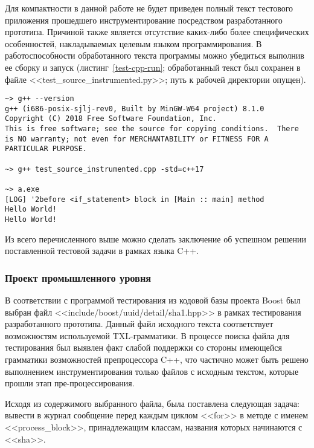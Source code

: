 Для компактности в данной работе не будет приведен полный текст тестового приложения прошедшего инструментирование посредством разработанного прототипа.
Причиной также является отсутствие каких-либо более специфических особенностей, накладываемых целевым языком программирования.
В работоспособности обработанного текста программы можно убедиться выполнив ее сборку и запуск (листинг~\ref{test-cpp-run}; обработанный текст был сохранен в файле <<test\_source\_instrumented.py>>; путь к рабочей директории опущен).

\begin{lstlisting}[frame=single, label={test-cpp-run}, caption={Результаты сборки и запуска обработанного тестового приложения.}]
~> g++ --version
g++ (i686-posix-sjlj-rev0, Built by MinGW-W64 project) 8.1.0
Copyright (C) 2018 Free Software Foundation, Inc.
This is free software; see the source for copying conditions.  There is NO warranty; not even for MERCHANTABILITY or FITNESS FOR A PARTICULAR PURPOSE.

~> g++ test_source_instrumented.cpp -std=c++17

~> a.exe
[LOG] '2before <if_statement> block in [Main :: main] method
Hello World!
Hello World!
\end{lstlisting}

Из всего перечисленного выше можно сделать заключение об успешном решении поставленной тестовой задачи в рамках языка C++.

\subsubsection{Проект промышленного уровня}

В соответствии с программой тестирования из кодовой базы проекта Boost был выбран файл <<include/boost/uuid/detail/sha1.hpp>> в рамках тестирования разработанного прототипа.
Данный файл исходного текста соответствует возможностям используемой TXL-грамматики.
В процессе поиска файла для тестирования был выявлен факт слабой поддержки со стороны имеющейся грамматики возможностей препроцессора C++, что частично может быть решено выполнением инструментирования только файлов с исходным текстом, которые прошли этап пре-процессирования.

Исходя из содержимого выбранного файла, была поставлена следующая задача:
вывести в журнал сообщение перед каждым циклом <<for>> в методе с именем <<process\_block>>, принадлежащим классам, названия которых начинаются с <<sha>>.

